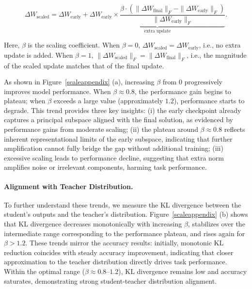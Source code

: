 \documentclass{llmxive}
\begin{document}
\begin{equation}
\Delta W_{\text{scaled}} = \Delta W_{\text{early}} + \underbrace{\Delta W_{\text{early}} \times \frac{\beta \cdot (\|\Delta W_{\text{final}}\|_F - \|\Delta W_{\text{early}}\|_F)}{\|\Delta W_{\text{early}}\|_F}}_{\text{extra update}}.
\end{equation}

Here, \(\beta\) is the scaling coefficient. When \(\beta = 0\), \(\Delta W_{\text{scaled}} = \Delta W_{\text{early}}\), i.e., no extra update is added. When \(\beta = 1\), \(\|\Delta W_{\text{scaled}}\|_F = \|\Delta W_{\text{final}}\|_F\), i.e., the magnitude of the scaled update matches that of the final update.



As shown in Figure~\ref{scaleappendix} (a), increasing $\beta$ from 0 progressively improves model performance. When $\beta \approx 0.8$, the performance gain begins to plateau; when $\beta$ exceeds a large value (approximately $1.2$), performance starts to degrade. This trend provides three key insights: (i) the early checkpoint already captures a principal subspace aligned with the final solution, as evidenced by performance gains from moderate scaling; (ii) the plateau around $\beta \approx 0.8$ reflects inherent representational limits of the early subspace, indicating that further amplification cannot fully bridge the gap without additional training; (iii) excessive scaling leads to performance decline, suggesting that extra norm amplifies noise or irrelevant components, harming task performance.

\paragraph{Alignment with Teacher Distribution.} 
To further understand these trends, we measure the KL divergence between the student’s outputs and the teacher’s distribution. Figure~\ref{scaleappendix} (b) shows that KL divergence decreases monotonically with increasing $\beta$, stabilizes over the intermediate range corresponding to the performance plateau, and rises again for $\beta > 1.2$. These trends mirror the accuracy results: initially, monotonic KL reduction coincides with steady accuracy improvement, indicating that closer approximation to the teacher distribution directly drives task performance. Within the optimal range ($\beta \approx 0.8$--$1.2$), KL divergence remains low and accuracy saturates, demonstrating strong student-teacher distribution alignment.
\end{document}

